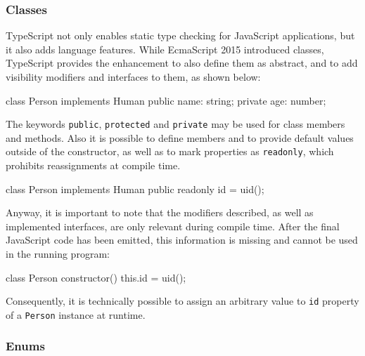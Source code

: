 \subsubsection{Classes}

TypeScript not only enables static type checking for JavaScript applications, but it also adds language features. While EcmaScript 2015 introduced classes, TypeScript provides the enhancement to also define them as abstract, and to add visibility modifiers and interfaces to them, as shown below:
\begin{JsCode}[numbers=none]
class Person implements Human {
  public name: string;
  private age: number;
}
\end{JsCode}
The keywords \texttt{public}, \texttt{protected} and \texttt{private} may be used for class members and methods. Also it is possible to define members and to provide default values outside of the constructor, as well as to mark properties as \texttt{readonly}, which prohibits reassignments at compile time.
\begin{JsCode}[numbers=none]
class Person implements Human {
  public readonly id = uid();
}
\end{JsCode}
Anyway, it is important to note that the modifiers described, as well as implemented interfaces, are only relevant during compile time. After the final JavaScript code has been emitted, this information is missing and cannot be used in the running program:
\begin{JsCode}[numbers=none]
class Person {
  constructor() {
    this.id = uid();
  }
}
\end{JsCode}
Consequently, it is technically possible to assign an arbitrary value to \texttt{id} property of a \texttt{Person} instance at runtime.

\subsubsection{Enums}

